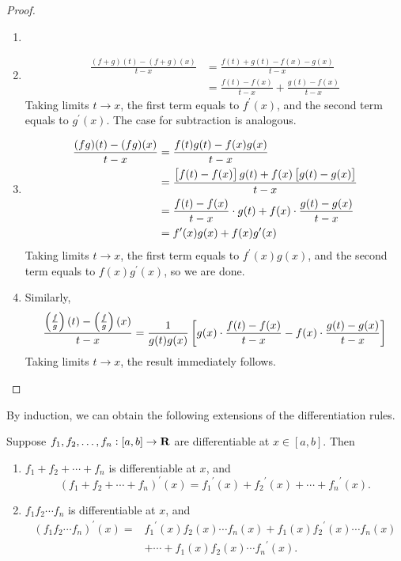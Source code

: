 \begin{proof} \
\begin{enumerate}[label=(\roman*)]
\item 
\item \begin{align*}
\frac{(f+g)(t)-(f+g)(x)}{t-x}
&=\frac{f(t)+g(t)-f(x)-g(x)}{t-x}\\
&=\frac{f(t)-f(x)}{t-x}+\frac{g(t)-f(x)}{t-x}
\end{align*}
Taking limits $t\to x$, the first term equals to $f^\prime(x)$, and the second term equals to $g^\prime(x)$. The case for subtraction is analogous.

\item \begin{align*}
\frac{(fg)(t)-(fg)(x)}{t-x}
&=\frac{f(t)g(t)-f(x)g(x)}{t-x}\\
&=\frac{\left[f(t)-f(x)\right]g(t)+f(x)\left[g(t)-g(x)\right]}{t-x}\\
&=\frac{f(t)-f(x)}{t-x}\cdot g(t)+f(x)\cdot\frac{g(t)-g(x)}{t-x}\\
&=f^\prime(x)g(x)+f(x)g^\prime(x)
\end{align*}
Taking limits $t\to x$, the first term equals to $f^\prime(x)g(x)$, and the second term equals to $f(x)g^\prime(x)$, so we are done.

\item Similarly,
\[\frac{\left(\frac{f}{g}\right)(t)-\left(\frac{f}{g}\right)(x)}{t-x}=\frac{1}{g(t)g(x)}\left[g(x)\cdot\frac{f(t)-f(x)}{t-x}-f(x)\cdot\frac{g(t)-g(x)}{t-x}\right]\]
Taking limits $t\to x$, the result immediately follows.
\end{enumerate}
\end{proof}

By induction, we can obtain the following extensions of the differentiation rules.

\begin{corollary}
Suppose $f_1,f_2,\dots,f_n:[a,b]\to\mathbf R$ are differentiable at $x\in[a,b]$. Then
\begin{enumerate}[label=(\roman*)]
\item $f_1+f_2+\cdots+f_n$ is differentiable at $x$, and
\[(f_1+f_2+\cdots+f_n)^\prime(x)={f_1}^\prime(x)+{f_2}^\prime(x)+\cdots+{f_n}^\prime(x).\]
\item $f_1f_2\cdots f_n$ is differentiable at $x$, and
\begin{align*}
(f_1f_2\cdots f_n)^\prime(x)
=&{f_1}^\prime(x)f_2(x)\cdots f_n(x)+f_1(x){f_2}^\prime(x)\cdots f_n(x)\\
&+\cdots+f_1(x)f_2(x)\cdots {f_n}^\prime(x).
\end{align*}
\end{enumerate}
\end{corollary}

